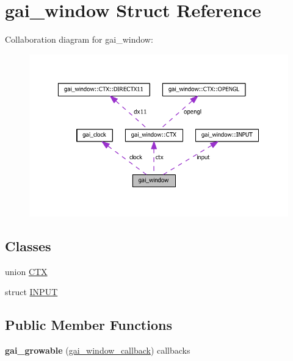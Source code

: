 \hypertarget{structgai__window}{}\section{gai\+\_\+window Struct Reference}
\label{structgai__window}


Collaboration diagram for gai\+\_\+window\+:\nopagebreak
\begin{figure}[H]
\begin{center}
\leavevmode
\includegraphics[width=350pt]{structgai__window__coll__graph}
\end{center}
\end{figure}
\subsection*{Classes}
\begin{DoxyCompactItemize}
\item 
union \hyperlink{structgai__window_uniongai__window_1_1_c_t_x}{C\+TX}
\item 
struct \hyperlink{structgai__window_structgai__window_1_1_i_n_p_u_t}{I\+N\+P\+UT}
\end{DoxyCompactItemize}
\subsection*{Public Member Functions}
\begin{DoxyCompactItemize}
\item 
\mbox{\label{structgai__window_a5ef904435ae2d6ac768e856ac809393d}} 
{\bfseries gai\+\_\+growable} (\hyperlink{gai_8h_structgai__window__callback}{gai\+\_\+window\+\_\+callback}) callbacks
\end{DoxyCompactItemize}
